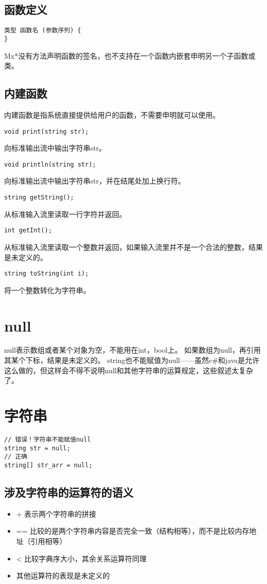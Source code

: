 \documentclass[twocolumn]{article}
\begin{document}
\subsection{函数定义}

\begin{verbatim}
类型 函数名 (参数序列) {
}
\end{verbatim}
Mx*没有方法声明函数的签名，也不支持在一个函数内嵌套申明另一个子函数或类。

\subsection{内建函数}
内建函数是指系统直接提供给用户的函数，不需要申明就可以使用。
\begin{verbatim}
void print(string str);
\end{verbatim}
向标准输出流中输出字符串str。
\begin{verbatim}
void println(string str);
\end{verbatim}
向标准输出流中输出字符串str，并在结尾处加上换行符。
\begin{verbatim}
string getString();
\end{verbatim}
从标准输入流里读取一行字符并返回。
\begin{verbatim}
int getInt();
\end{verbatim}
从标准输入流里读取一个整数并返回，如果输入流里并不是一个合法的整数，结果是未定义的。
\begin{verbatim}
string toString(int i);
\end{verbatim}
将一个整数转化为字符串。

\section{null}
null表示数组或者某个对象为空，不能用在int，bool上。
如果数组为null，再引用其某个下标，结果是未定义的。
string也不能赋值为null——虽然c\#和java是允许这么做的，但这样会不得不说明null和其他字符串的运算规定，这些叙述太复杂了。


\section{字符串}
\begin{verbatim}
// 错误！字符串不能赋值null
string str = null;
// 正确
string[] str_arr = null;
\end{verbatim}

\subsection{涉及字符串的运算符的语义}
\begin{itemize}
\item + 表示两个字符串的拼接
\item == 比较的是两个字符串内容是否完全一致（结构相等），而不是比较内存地址（引用相等）
\item < 比较字典序大小，其余关系运算符同理
\item 其他运算符的表现是未定义的
\end{itemize}
\end{document}
